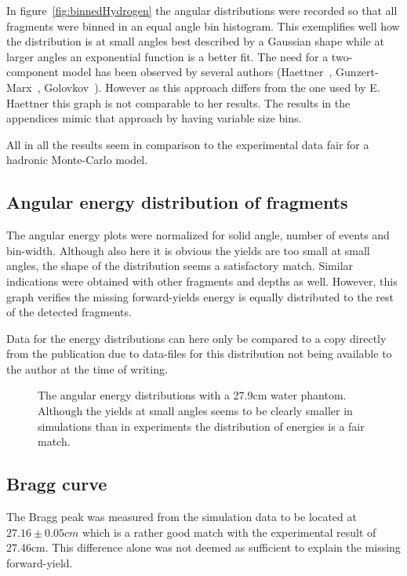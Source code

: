 In figure~\ref{fig:binnedHydrogen} the angular distributions were recorded so that all fragments were binned in an equal angle bin histogram. This exemplifies well how the distribution is at small angles best described by a Gaussian shape while at larger angles an exponential function is a better fit. The need for a two-component model has been observed by several authors (Haettner~\cite{ehaettner}, Gunzert-Marx~\cite{gunzert-marx}, Golovkov~\cite{golovkov}). However as this approach differs from the one used by E. Haettner this graph is not comparable to her results. The results in the appendices mimic that approach by having variable size bins.

All in all the results seem in comparison to the experimental data fair for a hadronic Monte-Carlo model.

\subsection{Angular energy distribution of fragments}
The angular energy plots were normalized for solid angle, number of events and bin-width. Although also here it is obvious the yields are too small at small angles, the shape of the distribution seems a satisfactory match. Similar indications were obtained with other fragments and depths as well. However, this graph verifies the missing forward-yields energy is equally distributed to the rest of the detected fragments.

Data for the energy distributions can here only be compared to a copy directly from the publication due to data-files for this distribution not being available to the author at the time of writing.

\begin{figure}[!ht]
\centering
{}
\label{fig:AngularEnergyDistribution}
\caption[Optional caption for list of figures]{The angular energy distributions with a 27.9cm water phantom. Although the yields at small angles seems to be clearly smaller in simulations than in experiments the distribution of energies is a fair match.}
\end{figure}

\subsection{Bragg curve}
The Bragg peak was measured from the simulation data to be located at $27.16 \pm 0.05 cm$ which is a rather good match with the experimental result of 27.46cm. This difference alone was not deemed as sufficient to explain the missing forward-yield.

